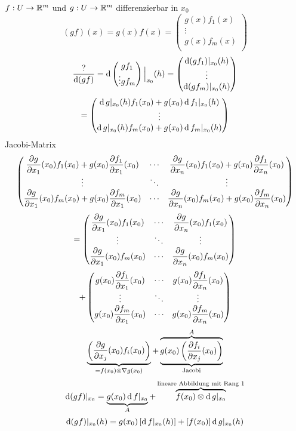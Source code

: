 \begin{Bem}
  $f:U\rightarrow\mathbb{R}^m$ und $g:U\rightarrow\mathbb{R}^m$ differenzierbar in $x_0$
  \[(gf)(x)=g(x)f(x)= \begin{pmatrix}
    g(x)f_1(x) \\
    \vdots \\
    g(x)f_m(x) \\
  \end{pmatrix}\]
  \[\frac{?}{\operatorname{d} (gf)}=\operatorname{d} \begin{pmatrix}
    gf_1 \\ \vdots g f_m
  \end{pmatrix} \Big|_{x_0}(h) = \begin{pmatrix}
    \operatorname{d} (gf_1)|_{x_0}(h)\\
    \vdots \\
    \operatorname{d} (gf_m)|_{x_0}(h)\\
  \end{pmatrix} \]
  \[ = \begin{pmatrix}
    \operatorname{d} g|_{x_0}(h)f_1(x_0)+g(x_0)\operatorname{d} f_1|_{x_0}(h)\\
    \vdots \\
    \operatorname{d} g|_{x_0}(h)f_m(x_0)+g(x_0)\operatorname{d} f_m|_{x_0}(h)\\
  \end{pmatrix} \]
  Jacobi-Matrix
  \[ \begin{pmatrix}
    \dfrac{\partial g}{\partial x_1}(x_0)f_1(x_0)+g(x_0)\dfrac{\partial f_1}{\partial x_1}(x_0) & \cdots & \dfrac{\partial g}{\partial x_n}(x_0)f_1(x_0)+g(x_0)\dfrac{\partial f_1}{\partial x_n}(x_0) \\
    \vdots & \ddots & \vdots \\
    \dfrac{\partial g}{\partial x_1}(x_0)f_m(x_0)+g(x_0)\dfrac{\partial f_m}{\partial x_1}(x_0) & \cdots & \dfrac{\partial g}{\partial x_n}(x_0)f_m(x_0)+g(x_0)\dfrac{\partial f_m}{\partial x_n}(x_0) \\
  \end{pmatrix} \]
  \[ = \begin{pmatrix}
    \dfrac{\partial g}{\partial x_1}(x_0)f_1(x_0) & \cdots & \dfrac{\partial g}{\partial x_n}(x_0)f_1(x_0) \\
    \vdots & \ddots & \vdots \\
    \dfrac{\partial g}{\partial x_1}(x_0)f_m(x_0) & \cdots & \dfrac{\partial g}{\partial x_n}(x_0)f_m(x_0) \\
  \end{pmatrix}\]
  \[+ \begin{pmatrix}
    g(x_0)\dfrac{\partial f_1}{\partial x_1}(x_0) & \cdots & g(x_0)\dfrac{\partial f_1}{\partial x_n}(x_0)\\
    \vdots & \ddots & \vdots \\
    g(x_0)\dfrac{\partial f_m}{\partial x_1}(x_0) & \cdots & g(x_0)\dfrac{\partial f_m}{\partial x_n}(x_0)\\
  \end{pmatrix} \]
  \[ \underbrace{\begin{pmatrix}
    \dfrac{\partial g}{\partial x_j}(x_0) f_i(x_0)
  \end{pmatrix}}_{ = f(x_0)\otimes \nabla g(x_0)} + \overbrace{\underbrace{g(x_0) \left( \dfrac{\partial f_i}{\partial x_j}(x_0) \right)}_{\text{Jacobi}}}^A\]
  \[\operatorname{d} (gf)|_{x_0}=\underbrace{g(x_0)\operatorname{d} f|_{x_0}}_A+\overbrace{f(x_0)\otimes \operatorname{d} g|_{x_0}}^{\text{lineare Abbildung mit Rang 1}}\]
  \[\operatorname{d} (gf)|_{x_0}(h)=g(x_0)\left[ \operatorname{d} f|_{x_0}(h) \right]+\left[ f(x_0) \right]\operatorname{d} g|_{x_0}(h)\]
\end{Bem}
